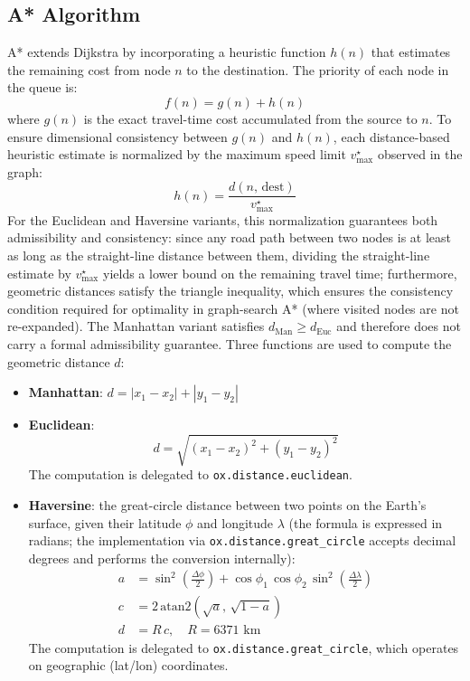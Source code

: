 \documentclass[12pt,a4paper]{article}
\begin{document}
\subsection{A* Algorithm}
\label{sec:astar_design}

A* extends Dijkstra by incorporating a heuristic function $h(n)$ that estimates the remaining cost from node $n$ to the destination.
The priority of each node in the queue is:
\[
  f(n) = g(n) + h(n)
\]
where $g(n)$ is the exact travel-time cost accumulated from the source to $n$.
To ensure dimensional consistency between $g(n)$ and $h(n)$, each distance-based heuristic estimate is normalized by the maximum speed limit $v_{\max}^{\star}$ observed in the graph:
\[
  h(n) = \frac{d(n,\, \text{dest})}{v_{\max}^{\star}}
\]
For the Euclidean and Haversine variants, this normalization guarantees both admissibility and consistency: since any road path between two nodes is at least as long as the straight-line distance between them, dividing the straight-line estimate by $v_{\max}^{\star}$ yields a lower bound on the remaining travel time; furthermore, geometric distances satisfy the triangle inequality, which ensures the consistency condition required for optimality in graph-search A* (where visited nodes are not re-expanded).
The Manhattan variant satisfies $d_{\text{Man}} \geq d_{\text{Euc}}$ and therefore does not carry a formal admissibility guarantee.
Three functions are used to compute the geometric distance $d$:

\begin{itemize}
  \item \textbf{Manhattan}: $d = |x_1 - x_2| + |y_1 - y_2|$

  \item \textbf{Euclidean}:
  \[
    d = \sqrt{(x_1 - x_2)^2 + (y_1 - y_2)^2}
  \]
  The computation is delegated to \texttt{ox.distance.euclidean}.

  \item \textbf{Haversine}: the great-circle distance between two points on the Earth's surface,
  given their latitude $\phi$ and longitude $\lambda$ (the formula is expressed in radians; the implementation via \texttt{ox.distance.great\_circle} accepts decimal degrees and performs the conversion internally):
  \begin{align*}
    a &= \sin^2\!\left(\frac{\Delta\phi}{2}\right)
       + \cos\phi_1\,\cos\phi_2\,\sin^2\!\left(\frac{\Delta\lambda}{2}\right) \\
    c &= 2\,\mathrm{atan2}\!\left(\sqrt{a},\,\sqrt{1-a}\right) \\
    d &= R\,c, \quad R = 6371\text{ km}
  \end{align*}
  The computation is delegated to \texttt{ox.distance.great\_circle}, which operates on geographic (lat/lon) coordinates.
\end{itemize}
\end{document}
